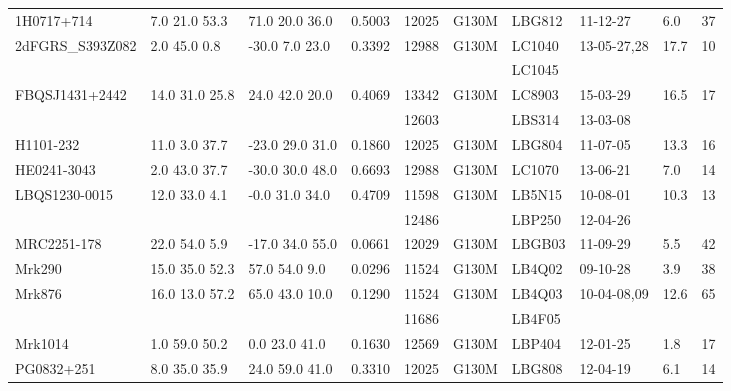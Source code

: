 \documentclass[twocolumn,tighten]{aastex6}
\begin{document}
\begin{table}[ht]
\begin{center}
\begin{tabular}{l l l l l l l l l l}
1H0717+714		  &  7.0  21.0   53.3  &     71.0  20.0  36.0  &    0.5003  & 12025  	    &   G130M  &   LBG812  		 & 11-12-27      	 	  &  6.0    &      37         \\
2dFGRS\_S393Z082  &  2.0  45.0    0.8   &    -30.0    7.0  23.0  &    0.3392  & 12988  	    &   G130M  &   LC1040    		 & 13-05-27,28 	 	  & 17.7   &      10         \\
				  &			       &				&		  &			    &		      &    LC1045			 &				  &	       &		   \\
FBQSJ1431+2442     & 14.0  31.0  25.8  &     24.0  42.0  20.0  &   0.4069   & 13342		    &   G130M  &   LC8903			& 15-03-29		  & 16.5  &      17          \\
				 &			      &				       &		 & 12603		    &		      &   LBS314			& 13-03-08		  &	      &		  	  \\
H1101-232   		 &  11.0  3.0   37.7  &    -23.0  29.0  31.0  &   0.1860   & 12025  		    &   G130M  &   LBG804  		& 11-07-05  		   & 13.3  &      16         \\
HE0241-3043  		 &   2.0  43.0  37.7  &    -30.0  30.0  48.0  &   0.6693   & 12988  		    &   G130M  &   LC1070  		& 13-06-21  		   & 7.0    &      14         \\
LBQS1230-0015  	 &   12.0  33.0  4.1  &    -0.0  31.0  34.0    &    0.4709  & 11598   	    &   G130M  &   LB5N15			& 10-08-01  		   & 10.3  &      13         \\
				 &			      &				       &		 & 12486		    &		      &   LBP250			& 12-04-26		   &	       &	  	   \\
MRC2251-178  	 &   22.0  54.0  5.9  &    -17.0  34.0  55.0  &   0.0661   & 12029  		    &   G130M  &   LBGB03                 & 11-09-29                   &  5.5   &      42         \\
Mrk290  			&  15.0  35.0  52.3  &     57.0  54.0  9.0    &    0.0296  & 11524		    &   G130M  &   LB4Q02   		& 09-10-28  		   &   3.9  &      38         \\
Mrk876  			&  16.0  13.0  57.2  &    65.0  43.0  10.0   &    0.1290  & 11524		    &   G130M  &   LB4Q03			& 10-04-08,09  		   & 12.6  &      65         \\
				 &			      &				       &		 & 11686		    &		      &   LB4F05			&				   &	       &	  	   \\
Mrk1014  			&    1.0  59.0  50.2  &    0.0  23.0  41.0     &    0.1630  & 12569  		    &   G130M  &   LBP404   	 	& 12-01-25  		   &  1.8   &      17         \\
PG0832+251  		&    8.0  35.0  35.9  &    24.0  59.0  41.0   &    0.3310  & 12025  		    &   G130M  &   LBG808			& 12-04-19		   &  6.1   &      14         \\

\end{tabular}
\end{center}
\end{table}
\end{document}

